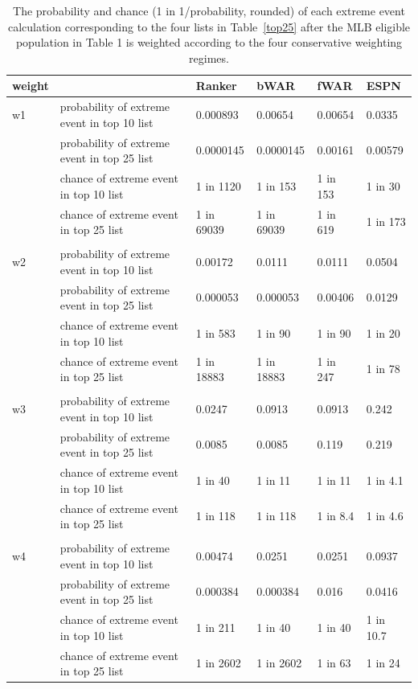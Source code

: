 \documentclass[11pt]{article}\usepackage[]{graphicx}\usepackage[]{color}
\begin{document}
\begin{table}[h!]
\begin{center}
\begin{tabular}{llllll}
\hline
 weight & &  Ranker  &  bWAR  &  fWAR  &  ESPN \\
 \hline
w1 & probability of extreme event in top 10 list 
  & 0.000893 
  & 0.00654 
  & 0.00654 
  & 0.0335 \\
& probability of extreme event in top 25 list 
  & 0.0000145 
  & 0.0000145 
  & 0.00161 
  & 0.00579 \\
& chance of extreme event in top 10 list 
  & 1 in 1120 
  & 1 in 153 
  & 1 in 153 
  & 1 in 30 \\
& chance of extreme event in top 25 list 
  & 1 in 69039 
  & 1 in 69039 
  & 1 in 619 
  & 1 in 173 \\
  & & & & & \\
w2 & probability of extreme event in top 10 list 
  & 0.00172 
  & 0.0111 
  & 0.0111 
  & 0.0504 \\
& probability of extreme event in top 25 list 
  & 0.000053 
  & 0.000053 
  & 0.00406 
  & 0.0129 \\
& chance of extreme event in top 10 list 
  & 1 in 583 
  & 1 in 90 
  & 1 in 90 
  & 1 in 20 \\
& chance of extreme event in top 25 list 
  & 1 in 18883 
  & 1 in 18883 
  & 1 in 247 
  & 1 in 78 \\
  & & & & & \\
w3 & probability of extreme event in top 10 list 
  & 0.0247 
  & 0.0913 
  & 0.0913 
  & 0.242 \\
& probability of extreme event in top 25 list 
  & 0.0085 
  & 0.0085 
  & 0.119 
  & 0.219 \\
& chance of extreme event in top 10 list 
  & 1 in 40 
  & 1 in 11 
  & 1 in 11 
  & 1 in 4.1 \\
& chance of extreme event in top 25 list 
  & 1 in 118 
  & 1 in 118 
  & 1 in 8.4 
  & 1 in 4.6 \\
  & & & & & \\  
w4 & probability of extreme event in top 10 list 
  & 0.00474 
  & 0.0251 
  & 0.0251 
  & 0.0937 \\
& probability of extreme event in top 25 list 
  & 0.000384 
  & 0.000384 
  & 0.016 
  & 0.0416 \\
& chance of extreme event in top 10 list 
  & 1 in 211 
  & 1 in 40 
  & 1 in 40 
  & 1 in 10.7 \\
& chance of extreme event in top 25 list 
  & 1 in 2602 
  & 1 in 2602 
  & 1 in 63 
  & 1 in 24 \\
  \hline
\end{tabular}
\end{center}
\caption{The probability and chance (1 in 1/probability, rounded) 
  of each extreme event calculation corresponding to the four lists in 
  Table~\ref{top25} after the MLB eligible population in Table 1 is 
  weighted according to the four conservative weighting regimes.}
\label{probvalues.weights}
\end{table}
\end{document}
